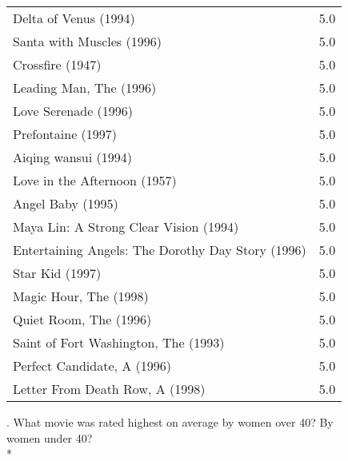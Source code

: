 \documentclass{article}
\begin{document}
\begin{tabular}{ l r }
Delta of Venus (1994)  & 5.0 \\
Santa with Muscles (1996)  & 5.0 \\
Crossfire (1947)  & 5.0 \\
Leading Man, The (1996)  & 5.0 \\
Love Serenade (1996)  & 5.0 \\
Prefontaine (1997)  & 5.0 \\
Aiqing wansui (1994)  & 5.0 \\
Love in the Afternoon (1957)  & 5.0 \\
Angel Baby (1995)  & 5.0 \\
Maya Lin: A Strong Clear Vision (1994)  & 5.0 \\
Entertaining Angels: The Dorothy Day Story (1996)  & 5.0 \\
Star Kid (1997)  & 5.0 \\
Magic Hour, The (1998)  & 5.0 \\
Quiet Room, The (1996)  & 5.0 \\
Saint of Fort Washington, The (1993)  & 5.0 \\
Perfect Candidate, A (1996)  & 5.0 \\
Letter From Death Row, A (1998)  & 5.0 \\
\end{tabular}

. What movie was rated highest on average by women over 40? By\\
women under 40?\\*
\end{document}
